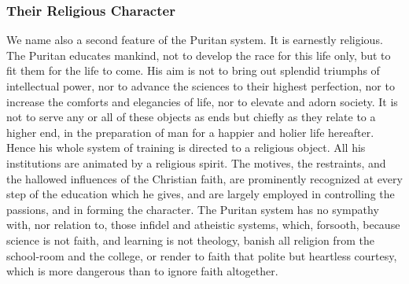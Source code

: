 \documentclass[]{book}
\begin{document}
\hypertarget{their-religious-character}{%
\subsubsection{Their Religious Character}\label{their-religious-character}}

We name also a second feature of the Puritan system. It is earnestly religious. The Puritan educates mankind, not to develop the race for this life only, but to fit them for the life to come. His aim is not to bring out splendid triumphs of intellectual power, nor to advance the sciences to their highest perfection, nor to increase the comforts and elegancies of life, nor to elevate and adorn society. It is not to serve any or all of these objects as ends but chiefly as they relate to a higher end, in the preparation of man for a happier and holier life hereafter. Hence his whole system of training is directed to a religious object. All his institutions are animated by a religious spirit. The motives, the restraints, and the hallowed influences of the Christian faith, are prominently recognized at every step of the education which he gives, and are largely employed in controlling the passions, and in forming the character. The Puritan system has no sympathy with, nor relation to, those infidel and atheistic systems, which, forsooth, because science is not faith, and learning is not theology, banish all religion from the school-room and the college, or render to faith that polite but heartless courtesy, which is more dangerous than to ignore faith altogether.
\end{document}
